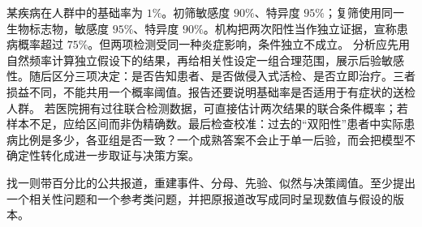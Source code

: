 某疾病在人群中的基础率为 \(1\%\)。初筛敏感度 \(90\%\)、特异度 \(95\%\)；复筛使用同一生物标志物，敏感度 \(95\%\)、特异度 \(90\%\)。机构把两次阳性当作独立证据，宣称患病概率超过 \(75\%\)。但两项检测受同一种炎症影响，条件独立不成立。 分析应先用自然频率计算独立假设下的结果，再给相关性设定一组合理范围，展示后验敏感性。随后区分三项决定：是否告知患者、是否做侵入式活检、是否立即治疗。三者损益不同，不能共用一个概率阈值。报告还要说明基础率是否适用于有症状的送检人群。 若医院拥有过往联合检测数据，可直接估计两次结果的联合条件概率；若样本不足，应给区间而非伪精确数。最后检查校准：过去的“双阳性”患者中实际患病比例是多少，各亚组是否一致？一个成熟答案不会止于单一后验，而会把模型不确定性转化成进一步取证与决策方案。

\begin{tcolorbox}[breakable,colback=white,colframe=blue!30!black,title={专题研读任务},fonttitle=\bfseries]
找一则带百分比的公共报道，重建事件、分母、先验、似然与决策阈值。至少提出一个相关性问题和一个参考类问题，并把原报道改写成同时呈现数值与假设的版本。
\end{tcolorbox}

